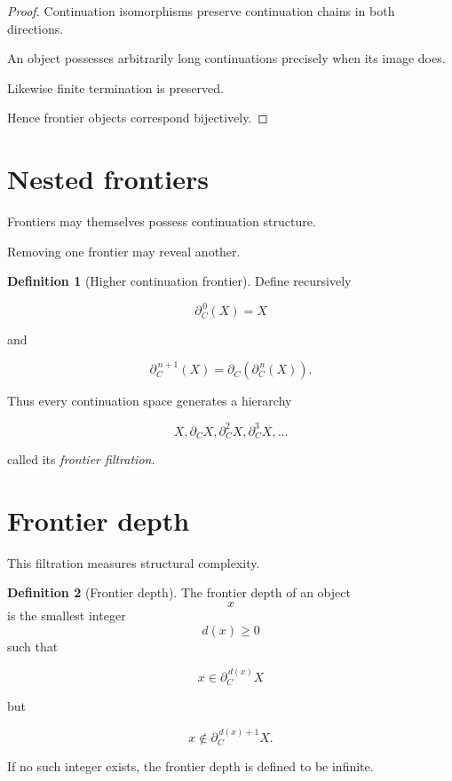 \documentclass[13pt,openany]{book}
\theoremstyle{plain}
\theoremstyle{definition}
\newtheorem{definition}{Definition}[chapter]
\begin{document}
\begin{proof}

Continuation isomorphisms preserve continuation chains in both directions.

An object possesses arbitrarily long continuations precisely when its image
does.

Likewise finite termination is preserved.

Hence frontier objects correspond bijectively.

\end{proof}


\section{Nested frontiers}

Frontiers may themselves possess continuation structure.

Removing one frontier may reveal another.

\begin{definition}[Higher continuation frontier]

Define recursively

\[
\partial_C^{\,0}(X)=X
\]

and

\[
\partial_C^{\,n+1}(X)
=
\partial_C
\left(
\partial_C^{\,n}(X)
\right).
\]

\end{definition}

Thus every continuation space generates a hierarchy

\[
X,
\partial_C X,
\partial_C^2X,
\partial_C^3X,
\dots
\]

called its
\emph{frontier filtration}.


\section{Frontier depth}

This filtration measures structural complexity.

\begin{definition}[Frontier depth]

The frontier depth of an object
\[
x
\]
is the smallest integer
\[
d(x)\ge0
\]
such that

\[
x
\in
\partial_C^{\,d(x)}X
\]

but

\[
x
\notin
\partial_C^{\,d(x)+1}X.
\]

If no such integer exists,
the frontier depth is defined to be infinite.

\end{definition}
\end{document}
